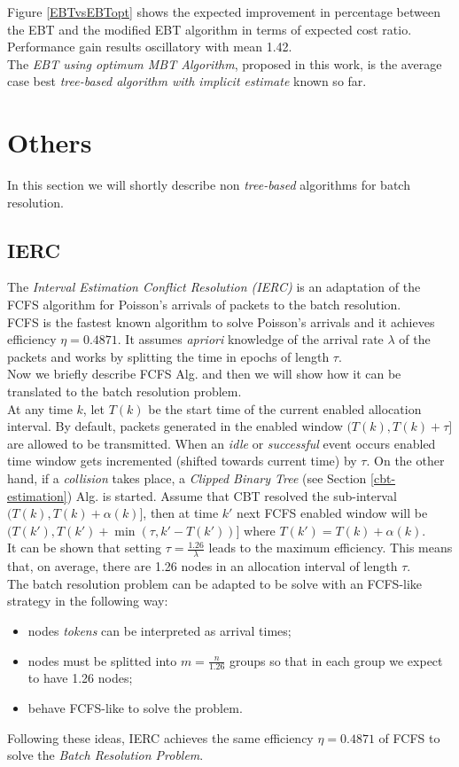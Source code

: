 \documentclass[12pt,a4paper]{report}
\begin{document}
Figure \ref{EBTvsEBTopt} shows the expected improvement in percentage between  the EBT and the modified EBT algorithm in terms of expected cost ratio. Performance gain results oscillatory with mean 1.42.\\

The \emph{EBT using optimum MBT Algorithm}, proposed in this work, is the average case best \emph{tree-based algorithm with implicit estimate} known so far.

\section{Others}
In this section we will shortly describe non \emph{tree-based} algorithms for batch resolution.
\subsection{IERC}
The \emph{Interval Estimation Conflict Resolution (IERC)} \cite{popovski} is an adaptation of the FCFS \cite{gallager} algorithm for Poisson's arrivals of packets to the batch resolution.\\
FCFS is the fastest known algorithm to solve Poisson's arrivals and it achieves efficiency $\eta=0.4871$.
It assumes \emph{apriori} knowledge of the arrival rate $\lambda$ of the packets and works by splitting the time in epochs of length $\tau$.\\
Now we briefly describe FCFS Alg. and then we will show how it can be translated to the batch resolution problem.\\ 

At any time $k$, let $T (k)$ be the start time of the current enabled allocation interval. By default, packets generated in the enabled window $(T(k),T(k)+\tau]$ are allowed to be transmitted.
When an \emph{idle} or \emph{successful} event occurs enabled time window gets incremented (shifted towards current time) by $\tau$. On the other hand, if a \emph{collision} takes place, a \emph{Clipped Binary Tree} (see Section \ref{cbt-estimation}) Alg. is started. Assume that CBT resolved the sub-interval $(T(k),T(k)+\alpha(k)]$, then at time $k'$ next FCFS enabled window will be $(T(k'),T(k')+\min(\tau,k'-T(k'))]$ where $T(k')=T(k)+\alpha(k)$.\\

It can be shown \cite{gallager} that setting  $\tau={\displaystyle \frac{1.26}{\lambda}}$ leads to the maximum efficiency. This means that, on average, there are 1.26 nodes in an allocation interval of length $\tau$.\\
The batch resolution problem can be adapted to be solve with an FCFS-like strategy in the following way:
\begin{itemize}
\item nodes \emph{tokens} can be interpreted as arrival times;
\item nodes must be splitted into $m={\displaystyle \frac{n}{1.26}}$ groups so that in each group we expect to have 1.26 nodes;
\item behave FCFS-like to solve the problem.
\end{itemize}
Following  these ideas, IERC achieves the same efficiency $\eta=0.4871$ of FCFS to solve the \emph{Batch Resolution Problem}.
\end{document}
